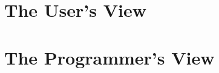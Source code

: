 \documentclass[twoside,11pt,a4paper,english]{article}
\begin{document}



\cleardoublepage
\section{The User's View}
\label{sec:users}









\cleardoublepage
\section{The Programmer's View}
\label{sec:programmers}








\cleardoublepage

\begin{appendix}

\end{appendix}
\end{document}
